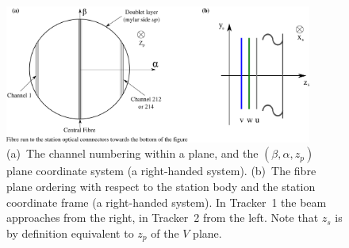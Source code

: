   \begin{figure}[htb]
    \begin{center}
      \includegraphics[width=0.9\textwidth]{02-CoordinateSystems/PlaneCoordinatesAndNumbering.pdf}
      \caption{\label{fig:DoubletLayerOrder} (a)~The channel numbering within a plane, and the $(\beta, \alpha, z_p)$ plane coordinate system (a right-handed system).  (b)~The fibre plane ordering with respect to the station body and the station coordinate frame (a right-handed system).  In Tracker~1 the beam approaches from the right, in Tracker~2 from the left. Note that $z_s$ is by definition equivalent to $z_p$ of the $V$ plane.}
    \end{center}
  \end{figure}
